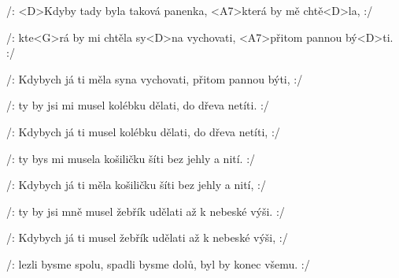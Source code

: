 

\zs
/: <D>Kdyby tady byla taková panenka,
<A7>která by mě chtě<D>la, :/

/: kte<G>rá by mi chtěla sy<D>na vychovati,
<A7>přitom pannou bý<D>ti. :/
\ks

\zs
/: Kdybych já ti měla syna vychovati, přitom pannou býti, :/

/: ty by jsi mi musel kolébku dělati, do dřeva netíti. :/
\ks

\zs
/: Kdybych já ti musel kolébku dělati, do dřeva netíti, :/

/: ty bys mi musela košiličku šíti bez jehly a nití. :/
\ks

\zs
/: Kdybych já ti měla košiličku šíti bez jehly a nití, :/

/: ty by jsi mně musel žebřík udělati až k nebeské výši. :/
\ks

\zs
/: Kdybych já ti musel žebřík udělati až k nebeské výši, :/

/: lezli bysme spolu, spadli bysme dolů, byl by konec všemu. :/
\ks

\kp
